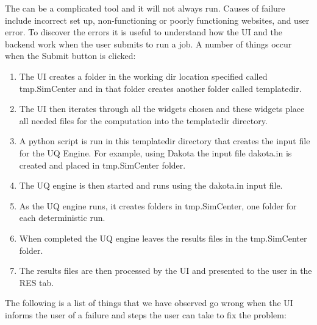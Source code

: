 The \texttt{\getsoftwarename{}} can be a complicated tool and it will not always run. Causes of failure include incorrect set up, non-functioning or poorly functioning websites, and user error. To discover the errors it is useful to understand how the UI and the backend work when the user submits to run a job. A number of things occur when the Submit button is clicked: 

\begin{enumerate}
\item The UI creates a folder in the working dir location specified called tmp.SimCenter and in that folder creates another folder called templatedir.
\item The UI then iterates through all the widgets chosen and these widgets place all needed files for the computation into the templatedir directory.
\item A python script is run in this templatedir directory that creates the input file for the UQ Engine. For example, using Dakota the input file dakota.in is created and placed in tmp.SimCenter folder.
\item The UQ engine is then started and runs using the dakota.in input file.
\item As the UQ engine runs, it creates folders in tmp.SimCenter, one folder for each deterministic run.
\item When completed the UQ engine leaves the results files in the tmp.SimCenter folder.
\item The results files are then processed by the UI and presented to the user in the RES tab.
\end{enumerate}

The following is a list of things that we have observed go wrong when the UI informs the user of a failure and steps the user can take to fix the problem:  

